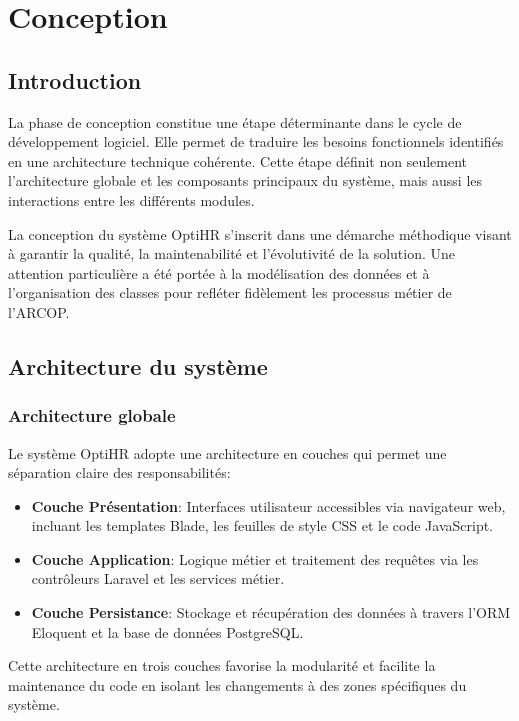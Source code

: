 \chapter{Conception}
\clearpage

\section{Introduction}
La phase de conception constitue une étape déterminante dans le cycle de développement logiciel. 
Elle permet de traduire les besoins fonctionnels identifiés en une architecture technique cohérente. 
Cette étape définit non seulement l'architecture globale et les composants principaux du système, 
mais aussi les interactions entre les différents modules.

La conception du système OptiHR s'inscrit dans une démarche méthodique visant à garantir 
la qualité, la maintenabilité et l'évolutivité de la solution. Une attention particulière 
a été portée à la modélisation des données et à l'organisation des classes pour refléter 
fidèlement les processus métier de l'ARCOP.

\section{Architecture du système}

\subsection{Architecture globale}
Le système OptiHR adopte une architecture en couches qui permet une séparation claire des responsabilités:

\begin{itemize}
    \item \textbf{Couche Présentation}: Interfaces utilisateur accessibles via navigateur web, incluant les templates Blade, les feuilles de style CSS et le code JavaScript.
    \item \textbf{Couche Application}: Logique métier et traitement des requêtes via les contrôleurs Laravel et les services métier.
    \item \textbf{Couche Persistance}: Stockage et récupération des données à travers l'ORM Eloquent et la base de données PostgreSQL.
\end{itemize}

Cette architecture en trois couches favorise la modularité et facilite la maintenance du code en isolant 
les changements à des zones spécifiques du système.

